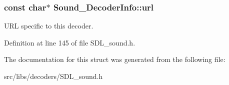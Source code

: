 \hypertarget{structSound__DecoderInfo_aa983be8195cd74f7dcaab2f4788309fb}{
\subsubsection[{url}]{\setlength{\rightskip}{0pt plus 5cm}const char$\ast$ {\bf Sound\-\_\-\-Decoder\-Info\-::url}}}\label{structSound__DecoderInfo_aa983be8195cd74f7dcaab2f4788309fb}
U\-R\-L specific to this decoder. 

Definition at line 145 of file S\-D\-L\-\_\-sound.\-h.



The documentation for this struct was generated from the following file\-:\begin{DoxyCompactItemize}
\item 
src/libs/decoders/S\-D\-L\-\_\-sound.\-h\end{DoxyCompactItemize}
